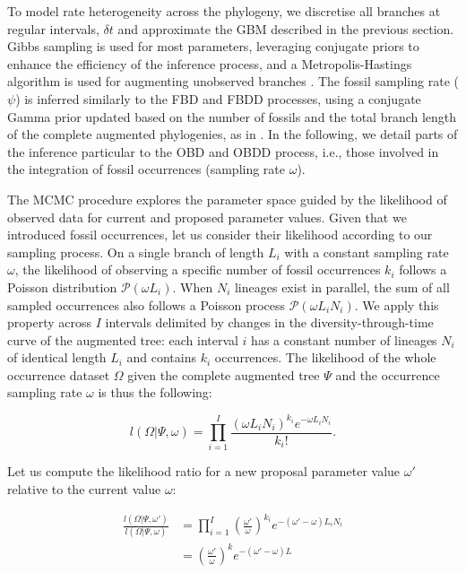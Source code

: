 \documentclass[oupdraft]{sysbio}
\begin{document}
To model rate heterogeneity across the phylogeny, we discretise all branches at regular intervals, $\delta t$ and approximate the GBM described in the previous section. Gibbs sampling is used for most parameters, leveraging conjugate priors to enhance the efficiency of the inference process, and a Metropolis-Hastings algorithm is used for augmenting unobserved branches \citep{quintero_imbalanced_2024, quintero_rise_2025}. The fossil sampling rate ($\psi$) is inferred similarly to the FBD and FBDD processes, using a conjugate Gamma prior updated based on the number of fossils and the total branch length of the complete augmented phylogenies, as in \citet{quintero_rise_2025}. In the following, we detail parts of the inference particular to the OBD and OBDD process, i.e., those involved in the integration of fossil occurrences (sampling rate $\omega$).

The MCMC procedure explores the parameter space guided by the likelihood of observed data for current and proposed parameter values. Given that we introduced fossil occurrences, let us consider their likelihood according to our sampling process. On a single branch of length $L_i$ with a constant sampling rate $\omega$, the likelihood of observing a specific number of fossil occurrences $k_i$ follows a Poisson distribution $\mathcal P(\omega L_i)$. When $N_i$ lineages exist in parallel, the sum of all sampled occurrences also follows a Poisson process $\mathcal P(\omega L_i N_i)$. We apply this property across $I$ intervals delimited by changes in the diversity-through-time curve of the augmented tree: each interval $i$ has a constant number of lineages $N_i$ of identical length $L_i$ and contains $k_i$ occurrences. The likelihood of the whole occurrence dataset $\Omega$ given the complete augmented tree $\Psi$ and the occurrence sampling rate $\omega$ is thus the following:

\begin{equation}\label{eq:ll_occ}
    l(\Omega|\Psi, \omega) = \prod_{i=1}^I \frac{(\omega L_i N_i)^{k_i}e^{-\omega L_i N_i}}{k_i!}.
\end{equation}

Let us compute the likelihood ratio for a new proposal parameter value $\omega'$ relative to the current value $\omega$:

\begin{align*}\label{eq:ll_ratio}
\frac{l(\Omega|\Psi, \omega')}{l(\Omega|\Psi, \omega)} &= \prod_{i=1}^I \left(\frac{\omega'}{\omega}\right)^{k_i}e^{-(\omega'-\omega) L_i N_i}\\
&= \left(\frac{\omega'}{\omega}\right)^{k}e^{-(\omega'-\omega) L}
\end{align*}
\end{document}

